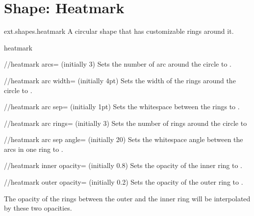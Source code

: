 %
%
%
\section{Shape: Heatmark}
\begin{pgflibrary}{ext.shapes.heatmark}
  A circular shape that has customizable rings around it.
\end{pgflibrary}

\begin{ext_shape}{heatmark}
  \begin{key}{/\pgfext/heatmark arcs= (initially 3)}
  Sets the number of arc around the circle to .
  \end{key}
  \begin{key}{/\pgfext/heatmark arc width= (initially 4pt)}
  Sets the width of the rings around the circle to .
  \end{key}
  \begin{key}{/\pgfext/heatmark arc sep= (initially 1pt)}
  Sets the whitespace between the rings to .
  \end{key}
  \begin{key}{/\pgfext/heatmark arc rings= (initially 3)}
  Sets the number of rings around the circle to 
  \end{key}
  \begin{key}{/\pgfext/heatmark arc sep angle= (initially 20)}
  Sets the whitespace angle between the arcs in one ring to .
  \end{key}
  \begin{key}{/\pgfext/heatmark inner opacity= (initially 0.8)}
  Sets the opacity of the inner ring to .
  \end{key}
  \begin{key}{/\pgfext/heatmark outer opacity= (initially 0.2)}
  Sets the opacity of the outer ring to .
  
  The opacity of the rings between the outer and the inner ring will be interpolated by these two opacities.
  \end{key}


\end{ext_shape}
